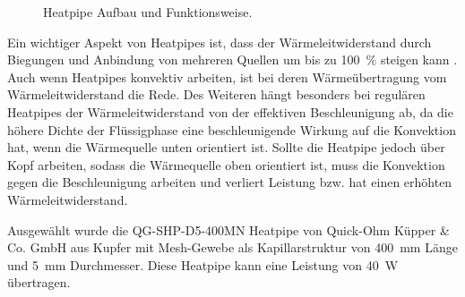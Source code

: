 \begin{figure}
  \centering
  \caption{Heatpipe Aufbau und Funktionsweise.}\label{fig:waermerohr}
\end{figure}

Ein wichtiger Aspekt von Heatpipes ist, dass der Wärmeleitwiderstand durch Biegungen und Anbindung von mehreren Quellen um bis zu \SI{100}{\percent}
steigen kann \cite{Mooney-2020}. Auch wenn Heatpipes konvektiv arbeiten, ist bei deren Wärmeübertragung vom Wärmeleitwiderstand die Rede.
Des Weiteren hängt besonders bei regulären Heatpipes der Wärmeleitwiderstand von der effektiven Beschleunigung ab,
da die höhere Dichte der Flüssigphase eine beschleunigende Wirkung auf die Konvektion hat, wenn die Wärmequelle unten orientiert ist. Sollte die Heatpipe jedoch
\glqq über Kopf \grqq{} arbeiten, sodass die Wärmequelle oben orientiert ist, muss die Konvektion gegen die Beschleunigung arbeiten und verliert Leistung bzw. hat
einen erhöhten Wärmeleitwiderstand.

Ausgewählt wurde die QG-SHP-D5-400MN Heatpipe von Quick-Ohm Küpper \& Co. GmbH aus Kupfer mit Mesh-Gewebe als Kapillarstruktur von \SI{400}{\milli\meter} Länge und
\SI{5}{\milli\meter} Durchmesser. Diese Heatpipe kann eine Leistung von \SI{40}{\watt} übertragen.

